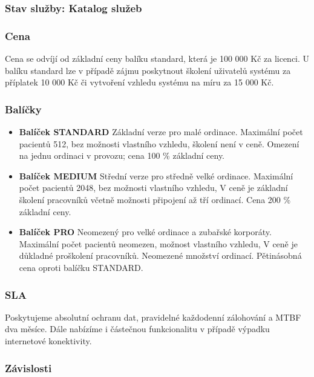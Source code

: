 \documentclass[11pt, a4paper, titlepage]{article}
\begin{document}
	\subsubsection*{Stav služby: Katalog služeb}

	\subsubsection*{Cena}
	\noindent Cena se odvíjí od základní ceny balíku standard, která je 100 000 Kč za licenci. U balíku standard lze v případě zájmu poskytnout školení uživatelů systému za příplatek 10 000 Kč či vytvoření vzhledu systému na míru za 15 000 Kč.

	\subsubsection*{Balíčky}

	\begin{itemize}		
		\item \textbf{Balíček STANDARD} Základní verze pro malé ordinace. Maximální počet pacientů 512, bez možnosti vlastního vzhledu, školení není v ceně. Omezení na jednu ordinaci v provozu; cena 100 \% základní ceny.

		\item \textbf{Balíček MEDIUM} Střední verze pro středně velké ordinace. Maximální počet pacientů 2048, bez možnosti vlastního vzhledu, V ceně je základní školení pracovníků včetně možnosti připojení až tří ordinací. Cena 200 \% základní ceny.

		\item \textbf{Balíček PRO} Neomezený pro velké ordinace a zubařské korporáty. Maximální počet pacientů neomezen, možnost vlastního vzhledu, V ceně je důkladné proškolení pracovníků. Neomezené množství ordinací. Pětinásobná cena oproti balíčku STANDARD.
	\end{itemize}

	\subsubsection*{SLA}

	Poskytujeme absolutní ochranu dat, pravidelné každodenní zálohování a MTBF dva měsíce. Dále nabízíme i částečnou funkcionalitu v případě výpadku internetové konektivity.

	\subsubsection*{Závislosti}
\end{document}
